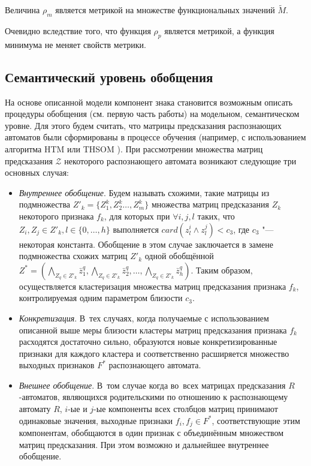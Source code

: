 \begin{Pred}
	Величина $\rho_m$ является метрикой на множестве функциональных значений $\tilde M$.
\end{Pred}

\begin{Proof}
	Очевидно вследствие того, что функция $\rho_p$ является метрикой, а функция минимума не меняет свойств метрики.
\end{Proof}

\subsection{Семантический уровень обобщения} 

На основе описанной модели компонент знака становится возможным описать процедуры обобщения (см. первую часть работы) на модельном, семантическом уровне. Для этого будем считать, что матрицы предсказания распознающих автоматов были сформированы в процессе обучения (например, с использованием алгоритма HTM \cite{Hawkins2009} или THSOM \cite{Koutn2008}). При рассмотрении множества матриц предсказания $\mathcal Z$ некоторого распознающего автомата возникают следующие три основных случая:

\begin{itemize}
	\item \textit{Внутреннее обобщение}. Будем называть схожими, такие матрицы из подмножества $Z'_k=\{Z_1^k,Z_2^k\dots,Z_m^k\}$ множества матриц предсказания $Z_k$ некоторого признака $f_k$, для которых при $\forall i,j,l$ таких, что $Z_i,Z_j\in Z'_k,l\in\{0,\dots,h\}$ выполняется $card(z_l^i\wedge z_l^j)<c_3$, где $c_3$ "--- некоторая константа. Обобщение в этом случае заключается в замене подмножества схожих матриц $Z'_k$ одной обобщённой $Z^*=(\bigwedge\limits_{Z_q\in Z'_k}\bar z_1^q,\bigwedge\limits_{Z_q\in Z'_k}\bar z_2^q,\dots,\bigwedge\limits_{Z_q\in Z'_k}\bar z_h^q)$. Таким образом, осуществляется кластеризация множества матриц предсказания признака $f_k$, контролируемая одним параметром близости $c_3$.
	\item \textit{Конкретизация}. В~тех случаях, когда получаемые с использованием описанной выше меры близости кластеры матриц предсказания признака $f_k$ расходятся достаточно сильно, образуются новые конкретизированные признаки для каждого кластера и соответственно расширяется множество выходных признаков $F^*$ распознающего автомата.
	\item \textit{Внешнее обобщение}. В~том случае когда во~всех матрицах предсказания $R$-автоматов, являющихся родительскими по отношению к распознающему автомату $R$, $i$-ые и $j$-ые компоненты всех столбцов матриц принимают одинаковые значения, выходные признаки $f_i,f_j\in F^*$, соответствующие этим компонентам, обобщаются в один признак с объединённым множеством матриц предсказания. При этом возможно и дальнейшее внутреннее обобщение.
\end{itemize}

